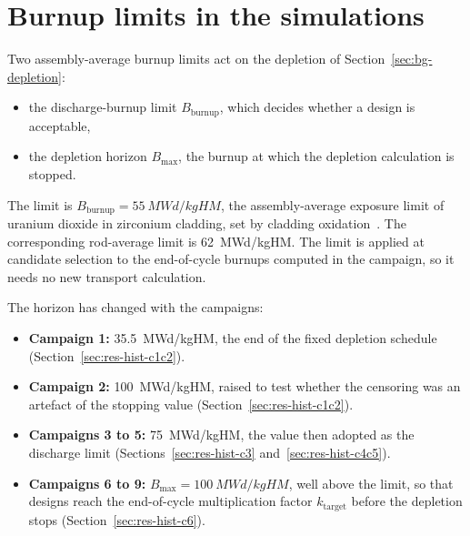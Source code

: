 \section{Burnup limits in the simulations}
\label{sec:meth-atf}

Two assembly-average burnup limits act on the depletion of
Section~\ref{sec:bg-depletion}:

\begin{itemize}
  \item the discharge-burnup limit $B_\mathrm{burnup}$, which decides
        whether a design is acceptable,

  \item the depletion horizon $B_\mathrm{max}$, the burnup at which the
        depletion calculation is stopped.
\end{itemize}

The limit is $B_\mathrm{burnup} = \SI{55}{MWd/kgHM}$, the
assembly-average exposure limit of uranium dioxide in zirconium
cladding, set by cladding oxidation~\cite{song_sanchez_2026,alam_2019_hotchannel}.
The corresponding rod-average limit is \SI{62}{MWd/kgHM}. The limit is
applied at candidate selection to
the end-of-cycle burnups computed in the campaign, so it needs no new transport
calculation.

The horizon has changed with the campaigns:

\begin{itemize}
  \item \textbf{Campaign 1:} \SI{35.5}{MWd/kgHM}, the end of the fixed
        depletion schedule (Section~\ref{sec:res-hist-c1c2}).

  \item \textbf{Campaign 2:} \SI{100}{MWd/kgHM}, raised to test whether
        the censoring was an artefact of the stopping value
        (Section~\ref{sec:res-hist-c1c2}).

  \item \textbf{Campaigns 3 to 5:} \SI{75}{MWd/kgHM}, the value then
        adopted as the discharge limit
        (Sections~\ref{sec:res-hist-c3} and~\ref{sec:res-hist-c4c5}).

  \item \textbf{Campaigns 6 to 9:} $B_\mathrm{max} =
        \SI{100}{MWd/kgHM}$, well above the limit, so that designs reach
        the end-of-cycle multiplication factor $k_\mathrm{target}$
        before the depletion stops (Section~\ref{sec:res-hist-c6}).
\end{itemize}

